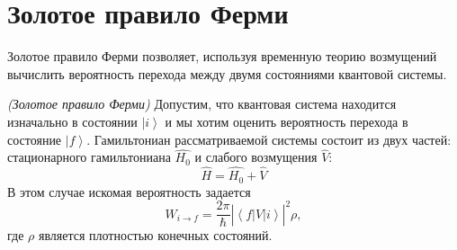 \section{Золотое правило Ферми}
Золотое правило Ферми позволяет, используя временную теорию возмущений
вычислить вероятность перехода между двумя состояниями квантовой
системы.

\begin{theorem}
  \emph{(Золотое правило Ферми)}
  \label{addQuantGoldenRuleFermi}
  Допустим, что квантовая система находится изначально в состоянии
  $\left|i\right>$ и мы хотим оценить вероятность перехода в состояние 
  $\left|f\right>$. Гамильтониан рассматриваемой системы состоит из
  двух частей: стационарного гамильтониана $\hat{H_0}$ и слабого
  возмущения $\hat{V}$:
  \begin{equation}
    \hat{H} = \hat{H_0} + \hat{V}
    \nonumber
  \end{equation}
  В этом случае искомая вероятность задается
  \begin{equation}
    W_{i \rightarrow f} = \frac{2 \pi}{\hbar}
    \left|
    \left<
    f
    \right|
    \hat{V}
    \left|
    i
    \right>
    \right|^2 \rho
    \nonumber,
  \end{equation}
  где $\rho$ является плотностью конечных состояний.
\end{theorem}

